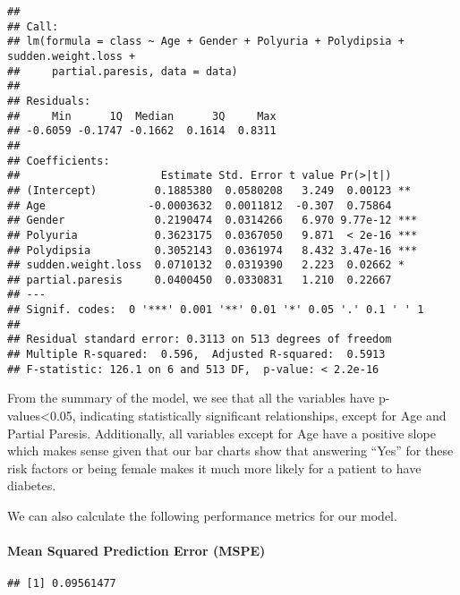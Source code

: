 \documentclass[
]{article}
\newenvironment{Shaded}{}{}
\newcommand{\DecValTok}[1]{\textcolor[rgb]{0.25,0.63,0.44}{#1}}
\newcommand{\KeywordTok}[1]{\textcolor[rgb]{0.00,0.44,0.13}{\textbf{#1}}}
\newcommand{\NormalTok}[1]{#1}
\newcommand{\OperatorTok}[1]{\textcolor[rgb]{0.40,0.40,0.40}{#1}}
\begin{document}
\begin{verbatim}
## 
## Call:
## lm(formula = class ~ Age + Gender + Polyuria + Polydipsia + sudden.weight.loss + 
##     partial.paresis, data = data)
## 
## Residuals:
##     Min      1Q  Median      3Q     Max 
## -0.6059 -0.1747 -0.1662  0.1614  0.8311 
## 
## Coefficients:
##                      Estimate Std. Error t value Pr(>|t|)    
## (Intercept)         0.1885380  0.0580208   3.249  0.00123 ** 
## Age                -0.0003632  0.0011812  -0.307  0.75864    
## Gender              0.2190474  0.0314266   6.970 9.77e-12 ***
## Polyuria            0.3623175  0.0367050   9.871  < 2e-16 ***
## Polydipsia          0.3052143  0.0361974   8.432 3.47e-16 ***
## sudden.weight.loss  0.0710132  0.0319390   2.223  0.02662 *  
## partial.paresis     0.0400450  0.0330831   1.210  0.22667    
## ---
## Signif. codes:  0 '***' 0.001 '**' 0.01 '*' 0.05 '.' 0.1 ' ' 1
## 
## Residual standard error: 0.3113 on 513 degrees of freedom
## Multiple R-squared:  0.596,  Adjusted R-squared:  0.5913 
## F-statistic: 126.1 on 6 and 513 DF,  p-value: < 2.2e-16
\end{verbatim}

From the summary of the model, we see that all the variables have
p-values\textless{}0.05, indicating statistically significant
relationships, except for Age and Partial Paresis. Additionally, all
variables except for Age have a positive slope which makes sense given
that our bar charts show that answering ``Yes'' for these risk factors
or being female makes it much more likely for a patient to have
diabetes.

We can also calculate the following performance metrics for our model.

\hypertarget{header-n919}{%
\paragraph{Mean Squared Prediction Error (MSPE)}\label{header-n919}}

\begin{Shaded}
\end{Shaded}

\begin{verbatim}
## [1] 0.09561477
\end{verbatim}
\end{document}
